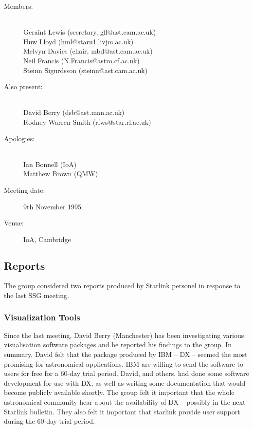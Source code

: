\begin{description}
\item[Members:]\mbox{}\\
Geraint Lewis (secretary, gfl@ast.cam.ac.uk)\\
Huw Lloyd (hml@staru1.livjm.ac.uk)\\
Melvyn Davies (chair, mbd@ast.cam.ac.uk)\\
Neil Francis (N.Francis@astro.cf.ac.uk)\\
Steinn Sigurdsson (steinn@ast.cam.ac.uk)

\item[Also present:]\mbox{}\\
David Berry (dsb@ast.man.ac.uk)\\
Rodney Warren-Smith (rfws@star.rl.ac.uk)

\item[Apologies:]\mbox{}\\
Ian Bonnell (IoA)\\
Matthew Brown (QMW)

\item[Meeting date:]9th November 1995

\item[Venue:]IoA, Cambridge
\end{description}

\subsection{Reports}

The group considered two reports produced by Starlink personel in
response to the last SSG meeting.

\subsubsection{Visualization Tools}

Since the last meeting, David Berry (Manchester) has been
investigating various visualisation software packages and he reported
his findings to the group. In summary, David felt that the package
produced by IBM -- DX -- seemed the most promising for astronomical
applications. IBM are willing to send the software to users for free
for a 60-day trial period.  David, and others, had done some software
development for use with DX, as well as writing some documentation
that would become publicly available shortly. The group felt it
important that the whole astronomical community hear about the
availability of DX -- possibly in the next Starlink bulletin. They
also felt it important that starlink provide user support during the
60-day trial period.

